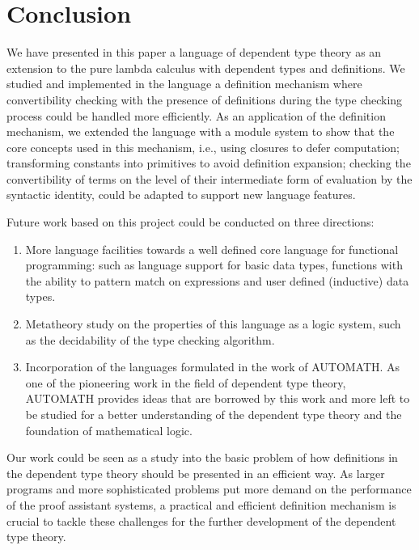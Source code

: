 \chapter{Conclusion}\label{chapter:conclusion}
We have presented in this paper a language of dependent type theory as an extension to the pure lambda calculus with dependent types and definitions. We studied and implemented in the language a definition mechanism where convertibility checking with the presence of definitions during the type checking process could be handled more efficiently. As an application of the definition mechanism, we extended the language with a module system to show that the core concepts used in this mechanism, i.e., using closures to defer computation; transforming constants into primitives to avoid definition expansion; checking the convertibility of terms on the level of their intermediate form of evaluation by the syntactic identity, could be adapted to support new language features.

Future work based on this project could be conducted on three directions:
\begin{enumerate}
\item More language facilities towards a well defined core language for functional programming: such as language support for basic data types, functions with the ability to pattern match on expressions and user defined (inductive) data types.
\item Metatheory study on the properties of this language as a logic system, such as the decidability of the type checking algorithm.
\item Incorporation of the languages formulated in the work of AUTOMATH. As one of the pioneering work in the field of dependent type theory, AUTOMATH provides ideas that are borrowed by this work and more left to be studied for a better understanding of the dependent type theory and the foundation of mathematical logic.
\end{enumerate}

Our work could be seen as a study into the basic problem of how definitions in the dependent type theory should be presented in an efficient way. As larger programs and more sophisticated problems put more demand on the performance of the proof assistant systems, a practical and efficient definition mechanism is crucial to tackle these challenges for the further development of the dependent type theory.